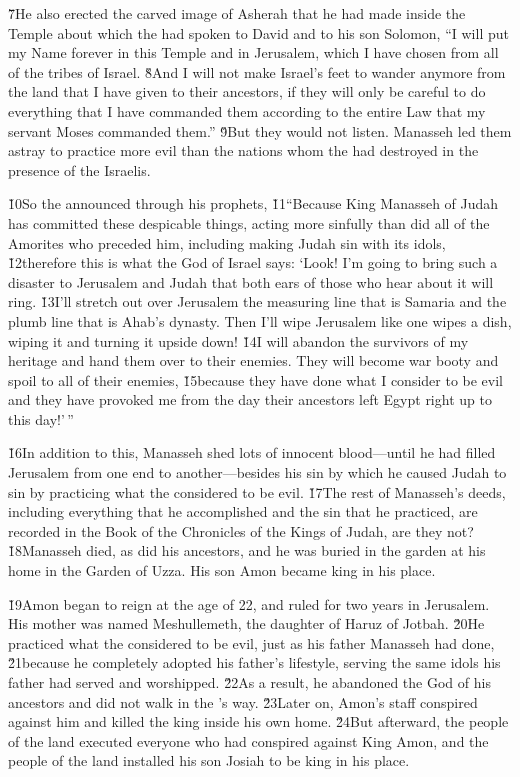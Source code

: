 \v{7}He also erected the carved image of Asherah that he had made inside the Temple about which the  had spoken to David and to his son Solomon, ``I will put my Name forever in this Temple and in Jerusalem, which I have chosen from all of the tribes of Israel. \v{8}And I will not make Israel's feet to wander anymore from the land that I have given to their ancestors, if they will only be careful to do everything that I have commanded them according to the entire Law that my servant Moses commanded them.'' \v{9}But they would not listen. Manasseh led them astray to practice more evil than the nations whom the  had destroyed in the presence of the Israelis.

\v{10}So the  announced through his prophets, \v{11}``Because King Manasseh of Judah has committed these despicable things, acting more sinfully than did all of the Amorites who preceded him, including making Judah sin with its idols, \v{12}therefore this is what the  God of Israel says: `Look! I'm going to bring such a disaster to Jerusalem and Judah that both ears of those who hear about it will ring. \v{13}I'll stretch out over Jerusalem the measuring line that is Samaria and the plumb line that is Ahab's dynasty. Then I'll wipe Jerusalem like one wipes a dish, wiping it and turning it upside down! \v{14}I will abandon the survivors of my heritage and hand them over to their enemies. They will become war booty and spoil to all of their enemies, \v{15}because they have done what I consider to be evil and they have provoked me from the day their ancestors left Egypt right up to this day!'\,''

\v{16}In addition to this, Manasseh shed lots of innocent blood---until he had filled Jerusalem from one end to another---besides his sin by which he caused Judah to sin by practicing what the  considered to be evil. \v{17}The rest of Manasseh's deeds, including everything that he accomplished and the sin that he practiced, are recorded in the Book of the Chronicles of the Kings of Judah, are they not? \v{18}Manasseh died, as did his ancestors, and he was buried in the garden at his home in the Garden of Uzza. His son Amon became king in his place.

\v{19}Amon began to reign at the age of 22, and ruled for two years in Jerusalem. His mother was named Meshullemeth, the daughter of Haruz of Jotbah. \v{20}He practiced what the  considered to be evil, just as his father Manasseh had done, \v{21}because he completely adopted his father's lifestyle, serving the same idols his father had served and worshipped. \v{22}As a result, he abandoned the  God of his ancestors and did not walk in the 's way. \v{23}Later on, Amon's staff conspired against him and killed the king inside his own home. \v{24}But afterward, the people of the land executed everyone who had conspired against King Amon, and the people of the land installed his son Josiah to be king in his place.


